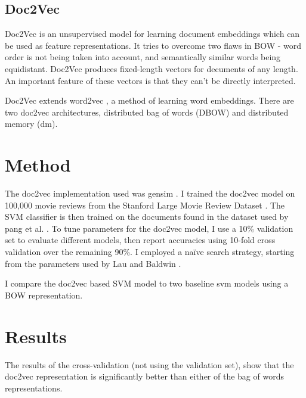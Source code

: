 \documentclass[a4paper]{article}
\begin{document}
\begin{multicols}{2}
\subsection{Doc2Vec}

Doc2Vec is an unsupervised model for learning document embeddings which can be used as feature representations. It tries to overcome two flaws in BOW - word order is not being taken into account, and semantically similar words being equidistant. Doc2Vec produces fixed-length vectors for decuments of any length. An important feature of these vectors is that they can't be directly interpreted.

Doc2Vec extends word2vec \cite{DBLP:journals/corr/MikolovSCCD13} , a method of learning word embeddings. There are two doc2vec architectures, distributed bag of words (DBOW) and distributed memory (dm).

\section{Method}

The doc2vec implementation used was gensim \cite{gensim}. I trained the doc2vec model on 100,000 movie reviews from the Stanford Large Movie Review Dataset \cite{maas-EtAl:2011:ACL-HLT2011}. The SVM classifier is then trained on the documents found in the dataset used by pang et al. \cite{pang2002thumbs}. To tune parameters for the doc2vec model, I use a 10\% validation set to evaluate different models, then report accuracies using 10-fold cross validation over the remaining 90\%. I employed a naïve search strategy, starting from the parameters used by Lau and Baldwin \cite{lau2016empirical}.

I compare the doc2vec based SVM model to two baseline svm models using a BOW representation.

\section{Results}

The results of the cross-validation (not using the validation set), show that the doc2vec representation is significantly better than either of the bag of words representations.


\end{multicols}
\end{document}
